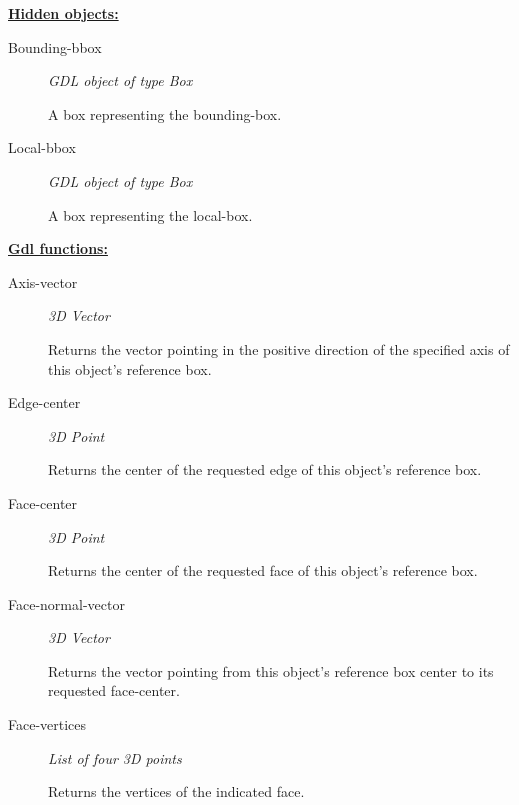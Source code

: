 \documentclass [11pt]{book}
\begin{document}
\begin{itemize}
\textbf{
\underline{Hidden objects:}}

\begin{description}

\item [Bounding-bbox]
\emph{GDL object of type Box}

 A box representing the bounding-box.




\item [Local-bbox]
\emph{GDL object of type Box}

 A box representing the local-box.




\end{description}






\textbf{
\underline{Gdl functions:}}

\begin{description}

\item [Axis-vector]
\emph{3D Vector}

 Returns the vector pointing in the positive direction of the specified axis of this object's reference box.




\item [Edge-center]
\emph{3D Point}

 Returns the center of the requested edge of this object's reference box.




\item [Face-center]
\emph{3D Point}

 Returns the center of the requested face of this object's reference box.




\item [Face-normal-vector]
\emph{3D Vector}

 Returns the vector pointing from this object's reference box center to its requested face-center.




\item [Face-vertices]
\emph{List of four 3D points}

 Returns the vertices of the indicated face.





\end{description}
\end{itemize}
\end{document}
